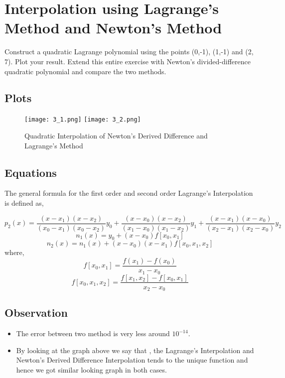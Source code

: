 \documentclass{article}
\begin{document}
\newpage
\section{Interpolation using Lagrange's Method and Newton's Method}
Construct a quadratic Lagrange polynomial using the points (0,-1), (1,-1) and (2, 7). Plot your result. Extend this entire exercise with Newton’s divided-difference quadratic
polynomial and compare the two methods.
\subsection{Plots}
\begin{figure}[!h]
    \centering
    \texttt{[image: 3\_1.png]}
    \texttt{[image: 3\_2.png]}
    \caption{Quadratic Interpolation of Newton's Derived Difference and Lagrange's Method}
\end{figure}
\subsection{Equations}
The general formula for the first order and second order  Lagrange's Interpolation is defined as,

$$p_2(x) = \frac{(x-x_1)(x-x_2)}{(x_0-x_1)(x_0-x_2)}y_0 + \frac{(x-x_0)(x-x_2)}{(x_1-x_0)(x_1-x_2)}y_1 + \frac{(x-x_1)(x-x_0)}{(x_2-x_1)(x_2-x_0)}y_2$$
$$n_1(x) = y_0 + (x-x_0)f[x_0,x_1]$$
$$n_2(x) = n_1(x) + (x-x_0)(x-x_1)f[x_0,x_1,x_2]$$
where,
$$f[x_0,x_1] = \frac{f(x_1)-f(x_0)}{x_1-x_0}$$
$$f[x_0,x_1,x_2] = \frac{f[x_1,x_2]-f[x_0,x_1]}{x_2-x_0}$$

\subsection{Observation}
\begin{itemize}
   \item The error between two method is very less around $10^{-14}$.
   \item By looking at the graph above we say that , the Lagrange's Interpolation and Newton's Derived Difference Interpolation tends to the unique function and hence we got similar looking graph in both cases.
\end{itemize}
\end{document}
